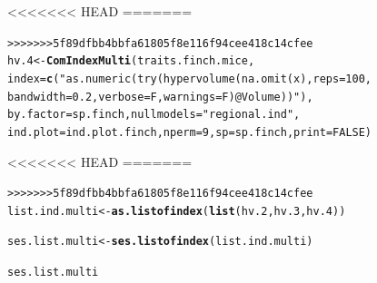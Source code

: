 \documentclass[12pt]{article}\usepackage[]{graphicx}\usepackage[]{color}
\makeatletter
\newcommand{\hlnum}[1]{\textcolor[rgb]{0.686,0.059,0.569}{#1}}%
\newcommand{\hlstr}[1]{\textcolor[rgb]{0.192,0.494,0.8}{#1}}%
\newcommand{\hlstd}[1]{\textcolor[rgb]{0.345,0.345,0.345}{#1}}%
\newcommand{\hlkwb}[1]{\textcolor[rgb]{0.69,0.353,0.396}{#1}}%
\newcommand{\hlkwc}[1]{\textcolor[rgb]{0.333,0.667,0.333}{#1}}%
\newcommand{\hlkwd}[1]{\textcolor[rgb]{0.737,0.353,0.396}{\textbf{#1}}}%
\newenvironment{kframe}{%
 \def\at@end@of@kframe{}%
 \ifinner\ifhmode%
  \def\at@end@of@kframe{\end{minipage}}%
  \begin{minipage}{\columnwidth}%
 \fi\fi%
 \def\FrameCommand##1{\hskip\@totalleftmargin \hskip-\fboxsep
 \colorbox{shadecolor}{##1}\hskip-\fboxsep
     \hskip-\linewidth \hskip-\@totalleftmargin \hskip\columnwidth}%
 \MakeFramed {\advance\hsize-\width
   \@totalleftmargin\z@ \linewidth\hsize
   \@setminipage}}%
 {\par\unskip\endMakeFramed%
 \at@end@of@kframe}
\newenvironment{knitrout}{}{} %
\makeatother
\begin{document}
\begin{knitrout}
\begin{kframe}
<<<<<<< HEAD
=======
{\ttfamily\noindent\bfseries{}}\begin{alltt}
>>>>>>> 5f89dfbb4bbfa61805f8e116f94cee418c14cfee
\hlstd{hv.4}\hlkwb{<-}\hlkwd{ComIndexMulti}\hlstd{(traits.finch.mice,}
             \hlkwc{index} \hlstd{=} \hlkwd{c}\hlstd{(}\hlstr{"as.numeric(try(hypervolume(na.omit(x), reps = 100, 
                 bandwidth = 0.2, verbose = F, warnings = F)@Volume))"}\hlstd{),}
             \hlkwc{by.factor} \hlstd{= sp.finch,} \hlkwc{nullmodels} \hlstd{=} \hlstr{"regional.ind"}\hlstd{,}
             \hlkwc{ind.plot} \hlstd{= ind.plot.finch,} \hlkwc{nperm} \hlstd{=} \hlnum{9}\hlstd{,} \hlkwc{sp} \hlstd{= sp.finch,} \hlkwc{print} \hlstd{=} \hlnum{FALSE}\hlstd{)}
\end{alltt}


<<<<<<< HEAD
=======
{\ttfamily\noindent\bfseries{}}\begin{alltt}
>>>>>>> 5f89dfbb4bbfa61805f8e116f94cee418c14cfee
\hlstd{list.ind.multi}\hlkwb{<-}\hlkwd{as.listofindex}\hlstd{(}\hlkwd{list}\hlstd{(hv.2, hv.3, hv.4))}
\end{alltt}


{\ttfamily\noindent\bfseries\color{errorcolor}{\#\# Error: objet 'hv.2' introuvable}}\begin{alltt}
\hlstd{ses.list.multi}\hlkwb{<-}\hlkwd{ses.listofindex}\hlstd{(list.ind.multi)}
\end{alltt}


{\ttfamily\noindent\bfseries\color{errorcolor}{\#\# Error: objet 'list.ind.multi' introuvable}}\begin{alltt}
\hlstd{ses.list.multi}
\end{alltt}


{\ttfamily\noindent\bfseries\color{errorcolor}{\#\# Error: objet 'ses.list.multi' introuvable}}\end{kframe}
\end{knitrout}
\end{document}
